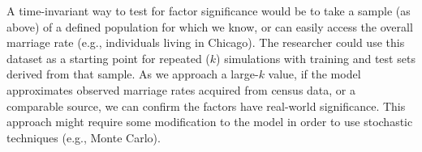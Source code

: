 \documentclass{report}
\begin{document}
A time-invariant way to test for factor significance would be to take a sample (as above) of a defined population for which we know, or can easily access the overall marriage rate (e.g., individuals living in Chicago). The researcher could use this dataset as a starting point for repeated ($k$) simulations with training and test sets derived from that sample. As we approach a large-$k$ value, if the model approximates observed marriage rates acquired from census data, or a comparable source, we can confirm the factors have real-world significance. This approach might require some modification to the model in order to use stochastic techniques (e.g., Monte Carlo). 
\end{document}
